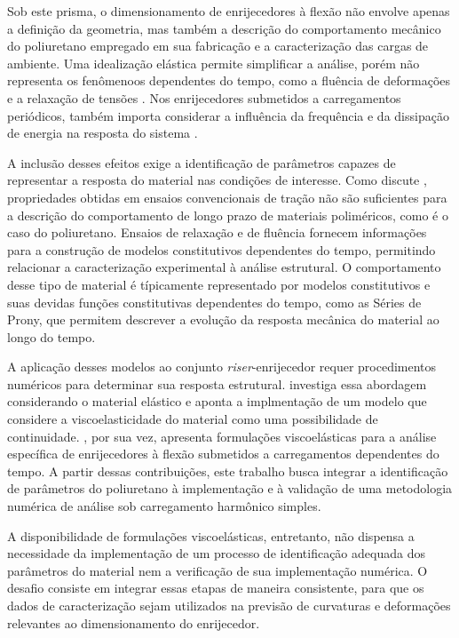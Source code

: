 \documentclass[arial,centeredequations,english,brazilian,oneside,section=TITLE]{ifes8}
\begin{document}
Sob este prisma, o dimensionamento de enrijecedores à flexão não envolve apenas a definição da geometria, mas também a descrição
do comportamento mecânico do poliuretano empregado em sua fabricação e a caracterização das cargas de ambiente. Uma 
idealização elástica permite simplificar a análise, porém não representa os fenômenoos dependentes do tempo, como a fluência 
de deformações e a relaxação de tensões \cite{Pagliosa2004}. Nos enrijecedores submetidos a carregamentos periódicos, também
importa considerar a influência da frequência e da dissipação de energia na resposta do sistema \cite{Caire2011}. 

A inclusão desses efeitos exige a identificação de parâmetros capazes de representar a resposta do material nas condições
de interesse. Como discute , propriedades obtidas em ensaios convencionais de tração não são suficientes
para a descrição do comportamento de longo prazo de materiais poliméricos, como é o caso do poliuretano. Ensaios de 
relaxação e de fluência fornecem informações para a construção de modelos constitutivos dependentes do tempo, permitindo
relacionar a caracterização experimental à análise estrutural. O comportamento desse tipo de material é típicamente 
representado por modelos constitutivos e suas devidas funções constitutivas dependentes do tempo, como as Séries de Prony,
que permitem descrever a evolução da resposta mecânica do material ao longo do tempo.

A aplicação desses modelos ao conjunto \emph{riser}-enrijecedor requer procedimentos numéricos para determinar sua resposta
estrutural.  investiga essa abordagem considerando o material elástico e aponta a implmentação de um modelo 
que considere a viscoelasticidade do material como uma possibilidade de continuidade. , por sua vez, apresenta
formulações viscoelásticas para a análise específica de enrijecedores à flexão submetidos a carregamentos dependentes do 
tempo. A partir dessas contribuições, este trabalho busca integrar a identificação de parâmetros do poliuretano à 
implementação e à validação de uma metodologia numérica de análise sob carregamento harmônico simples.

A disponibilidade de formulações viscoelásticas, entretanto, não dispensa a necessidade da implementação de um processo de 
identificação adequada dos parâmetros do material nem a verificação de sua implementação numérica. O desafio consiste em 
integrar essas etapas de maneira consistente, para que os dados de caracterização sejam utilizados na previsão de curvaturas
e deformações relevantes ao dimensionamento do enrijecedor.
\end{document}
